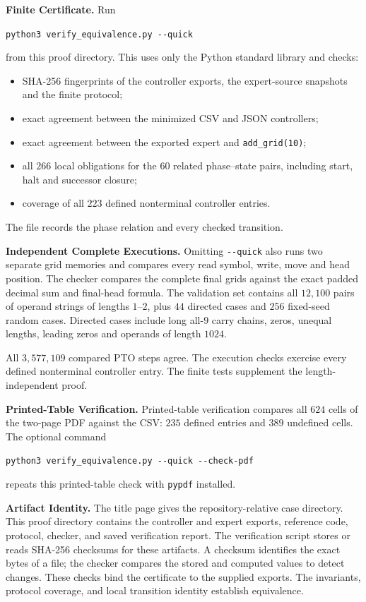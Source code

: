 \documentclass[11pt,a4paper]{article}
\newcommand{\code}[1]{\texttt{#1}}
\begin{document}
\textbf{Finite Certificate.}
Run
\begin{center}\code{python3 verify\_equivalence.py {-}{-}quick}\end{center}
from this proof directory. This uses only the Python standard library and checks:
\begin{itemize}
\item SHA-256 fingerprints of the controller exports, the expert-source
snapshots and the finite protocol;
\item exact agreement between the minimized CSV and JSON controllers;
\item exact agreement between the exported expert and \code{add\_grid(10)};
\item all $266$ local obligations for the $60$ related phase--state pairs,
including start, halt and successor closure;
\item coverage of all $223$ defined nonterminal controller entries.
\end{itemize}
The file  records the phase relation
and every checked transition.

\textbf{Independent Complete Executions.}
Omitting \code{{-}{-}quick} also runs two separate grid memories and compares
every read symbol, write, move and head position. The checker compares the complete final grids against the exact padded decimal sum and final-head formula.
The validation set contains all $12{,}100$ pairs of operand strings of
lengths $1$--$2$, plus $44$ directed cases and $256$ fixed-seed random cases.
Directed cases include long all-$9$ carry chains, zeros, unequal lengths,
leading zeros and operands of length $1024$.

All $3{,}577{,}109$ compared PTO steps agree. The execution checks exercise every defined nonterminal controller entry. The finite tests supplement the length-independent proof.

\textbf{Printed-Table Verification.}
Printed-table verification compares all $624$ cells of the two-page PDF
against the CSV: $235$ defined entries and $389$ undefined cells.
The optional command
\begin{center}\code{python3 verify\_equivalence.py {-}{-}quick {-}{-}check-pdf}\end{center}
repeats this printed-table check with \code{pypdf} installed.

\textbf{Artifact Identity.}
The title page gives the repository-relative case directory. This proof directory
contains the controller and expert exports, reference code, protocol, checker,
and saved verification report. The verification script stores or reads SHA-256 checksums for these artifacts. A checksum identifies the exact bytes
of a file; the checker compares the stored and computed values to detect changes.
These checks bind the certificate to the supplied exports. The invariants,
protocol coverage, and local transition identity establish equivalence.
\end{document}
